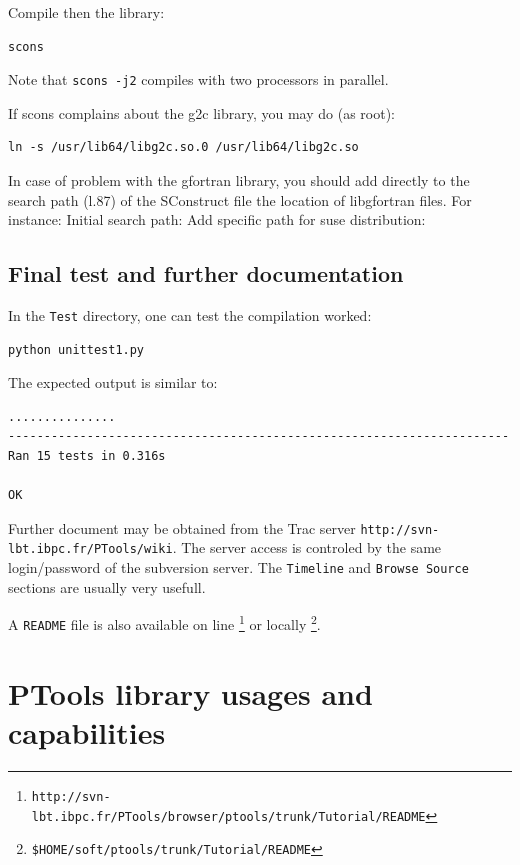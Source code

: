 \documentclass[12pt,a4paper]{article}
\begin{document}
Compile then the library:
\begin{verbatim}
scons
\end{verbatim}

Note that {\tt scons -j2} compiles with two processors in parallel.

If scons complains about the g2c library, you may do (as root):
\begin{verbatim}
ln -s /usr/lib64/libg2c.so.0 /usr/lib64/libg2c.so
\end{verbatim}

In case of problem with the gfortran library, you should add directly to the search path (l.87)
of the SConstruct file the location of libgfortran files. For instance: 
\newline Initial search path:
\newline Add specific path for suse distribution:

\subsection{Final test and further documentation}

In the {\tt Test} directory, one can test the compilation worked:
\begin{verbatim}
python unittest1.py
\end{verbatim}

The expected output is similar to:
\begin{verbatim}
...............
----------------------------------------------------------------------
Ran 15 tests in 0.316s

OK
\end{verbatim}

Further document may be obtained from the Trac server {\tt http://svn-lbt.ibpc.fr/PTools/wiki}. 
The server access is controled by the same login/password of the subversion server. The {\tt Timeline}
and {\tt Browse Source} sections are usually very usefull.

A {\tt README} file is also available on line 
\footnote{\tt http://svn-lbt.ibpc.fr/PTools/browser/ptools/trunk/Tutorial/README} 
or locally \footnote{\tt \$HOME/soft/ptools/trunk/Tutorial/README}.


\section{PTools library usages and capabilities}
\end{document}
